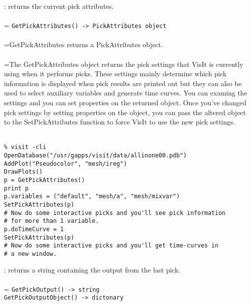 \documentclass[10pt,a4paper]{report}
\begin{document}
{}
: returns the current pick attributes.\\[-3mm]

 \\ 
\hangindent=\parindent 
\verb!GetPickAttributes() -> PickAttributes object!\\ [-3mm]

 \\ 
\hangindent=\parindent GetPickAttributes returns a PickAttributes object. \\[-3mm] 

 \\ 
\hangindent=\parindent The GetPickAttributes object returns the pick settings that VisIt is currently using when it performs picks. These settings mainly determine which pick information is displayed when pick results are printed out but they can also be used to select auxiliary variables and generate time curves. You can examing the settings and you can set properties on the returned object. Once you've changed pick settings by setting properties on the object, you can pass the altered object to the SetPickAttributes function to force VisIt to use the new pick settings. \\[-3mm] 

\\[-6mm]
\begin{verbatim}% visit -cli
OpenDatabase("/usr/gapps/visit/data/allinone00.pdb")
AddPlot("Pseudocolor", "mesh/ireg")
DrawPlots()
p = GetPickAttributes()
print p
p.variables = ("default", "mesh/a", "mesh/mixvar")
SetPickAttributes(p)
# Now do some interactive picks and you'll see pick information
# for more than 1 variable.
p.doTimeCurve = 1
SetPickAttributes(p)
# Now do some interactive picks and you'll get time-curves in 
# a new window.
\end{verbatim}
\newpage


{}
: returns a string containing the output from the last pick.\\[-3mm]

 \\ 
\hangindent=\parindent 
\verb!GetPickOutput() -> string!\\ 
\verb!GetPickOutputObject() -> dictonary!\\ [-3mm]
\end{document}
